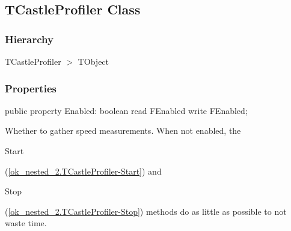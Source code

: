 \documentclass{report}
\newif\ifpdf
\begin{document}
\subsection*{TCastleProfiler Class}
\fi
\label{ok_nested_2.TCastleProfiler}
\subsubsection*{\large{\textbf{Hierarchy}}\normalsize\hspace{1ex}\hfill}
TCastleProfiler {$>$} TObject
\subsubsection*{\large{\textbf{Properties}}\normalsize\hspace{1ex}\hfill}
\begin{list}{}{
\setlength{\itemindent}{0cm}
\setlength{\listparindent}{0cm}
\setlength{\leftmargin}{\evensidemargin}
\addtolength{\leftmargin}{\tmplength}
\settowidth{\labelsep}{X}
\addtolength{\leftmargin}{\labelsep}
\setlength{\labelwidth}{\tmplength}
}
\label{ok_nested_2.TCastleProfiler-Enabled}
\item[\textbf{Enabled}\hfill]
\ifpdf
\begin{flushleft}
\fi
\begin{ttfamily}
public property Enabled: boolean read FEnabled write FEnabled;\end{ttfamily}

\ifpdf
\end{flushleft}
\fi


\par Whether to gather speed measurements. When not enabled, the \begin{ttfamily}Start\end{ttfamily}(\ref{ok_nested_2.TCastleProfiler-Start}) and \begin{ttfamily}Stop\end{ttfamily}(\ref{ok_nested_2.TCastleProfiler-Stop}) methods do as little as possible to not waste time.\end{list}
\end{document}
